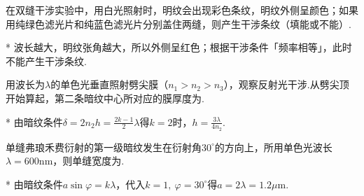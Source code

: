 {\begin{problem}[光的相干条件][4]
    在双缝干涉实验中，用白光照射时，明纹会出现彩色条纹，明纹外侧呈颜色；如果用纯绿色滤光片和纯蓝色滤光片分别盖住两缝，则产生干涉条纹（填能或不能）.
\end{problem}
\begin{solution}*
    波长越大，明纹张角越大，所以外侧呈红色；根据干涉条件「频率相等」，此时不能产生干涉条纹.
\end{solution}

\begin{problem}[劈尖干涉][3]
    用波长为$\lambda$的单色光垂直照射劈尖膜（$n_1>n_2>n_3$），观察反射光干涉.从劈尖顶开始算起，第二条暗纹中心所对应的膜厚度为.
\end{problem}
\begin{solution}*
    由暗纹条件$\delta=2n_2h=\frac{2k-1}{2}\lambda$得$k=2$时，$h=\frac{3\lambda}{4n_2}$.
\end{solution}

\begin{problem}[弗琅禾费衍射][3]
    单缝弗琅禾费衍射的第一级暗纹发生在衍射角$30^{\circ}$的方向上，所用单色光波长$\lambda=600\mathrm{nm}$，则单缝宽度为.
\end{problem}
\begin{solution}*
    由暗纹条件$a\sin{\varphi}=k\lambda$，代入$k=1,\ \varphi=30^{\circ}$得$a=2\lambda=1.2\mu\mathrm{m}$.
\end{solution}
}

